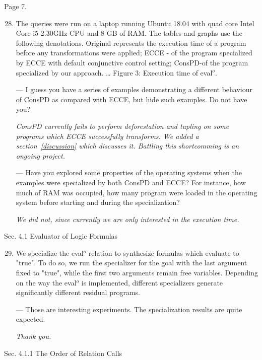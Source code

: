 Page 7.

\begin{enumerate}
  \setcounter{enumi}{27}

  \item {The queries were run on a laptop running Ubuntu 18.04 with quad core Intel Core i5 2.30GHz CPU and 8 GB of RAM. The tables and graphs use the following denotations. Original represents the execution time of a program before any transformations were applied; ECCE - of the program specialized by ECCE with default conjunctive control setting; ConsPD-of the program specialized by our approach. … Figure 3: Execution time of eval$^o$.

  --- I guess you have a series of examples demonstrating a different behaviour of ConsPD as compared with ECCE, but hide such examples. Do not have you?

  \emph{ConsPD currently fails to perform deforestation and tupling on some programs which ECCE successfully transforms. We added a section~\ref{discussion} which discusses it. Battling this shortcomming is an ongoing project. }

  --- Have you explored some properties of the operating systems when the examples were specialized by both ConsPD and ECCE? For instance, how much of RAM was occupied, how many program were loaded in the operating system before starting and during the specialization?

  \emph{We did not, since currently we are only interested in the execution time.}
  }

\end{enumerate}

Sec. 4.1 Evaluator of Logic Formulas

\begin{enumerate}
  \setcounter{enumi}{28}
  \item {
    We specialize the eval$^o$ relation to synthesize formulas which evaluate to "true". To do so, we run the specializer for the goal with the last argument fixed to "true", while the first two arguments remain free variables. Depending on the way the eval$^o$ is implemented, different specializers generate significantly different residual programs.

    --- Those are interesting experiments. The specialization results are quite expected.

    \emph{Thank you.}
  }
\end{enumerate}

Sec. 4.1.1 The Order of Relation Calls

